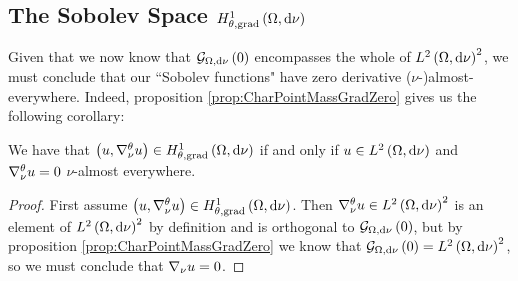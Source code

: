 \subsection{The Sobolev Space $H^1_{\theta, \mathrm{grad}}\left( \Omega, \mathrm{d}\nu \right)$} \label{appS:VertexSobSpace}
Given that we now know that $\mathcal{G}_{ \Omega, \mathrm{d}\nu}\left( 0 \right)$ encompasses the whole of $L^{2}\left( \Omega,\mathrm{d}\nu \right)^2$, we must conclude that our ``Sobolev functions" have zero derivative ($\nu$-)almost-everywhere.
Indeed, proposition \ref{prop:CharPointMassGradZero} gives us the following corollary:
\begin{cory} \label{cory:CharPointMassSpace}
	We have that $\left( u,\nabla^{\theta}_{\nu}u \right)\in H^1_{\theta, \mathrm{grad}}\left( \Omega, \mathrm{d}\nu \right)$ if and only if $u\in L^{2}\left( \Omega,\mathrm{d}\nu \right)$ and $\nabla^{\theta}_{\nu}u = 0$ $\nu$-almost everywhere.
\end{cory}
\begin{proof}
	First assume $\left( u,\nabla^{\theta}_{\nu}u \right)\in H^1_{\theta, \mathrm{grad}}\left( \Omega, \mathrm{d}\nu \right)$.
	Then $\nabla^{\theta}_{\nu}u\in L^{2}\left( \Omega,\mathrm{d}\nu \right)^2$ is an element of $L^{2}\left( \Omega,\mathrm{d}\nu \right)^2$ by definition and is orthogonal to $\mathcal{G}_{ \Omega, \mathrm{d}\nu}\left( 0 \right)$, but by proposition \ref{prop:CharPointMassGradZero} we know that $\mathcal{G}_{ \Omega, \mathrm{d}\nu}\left( 0 \right)=L^{2}\left( \Omega,\mathrm{d}\nu \right)^2$, so we must conclude that $\nabla_{\nu}u = 0$.
	

\end{proof}
